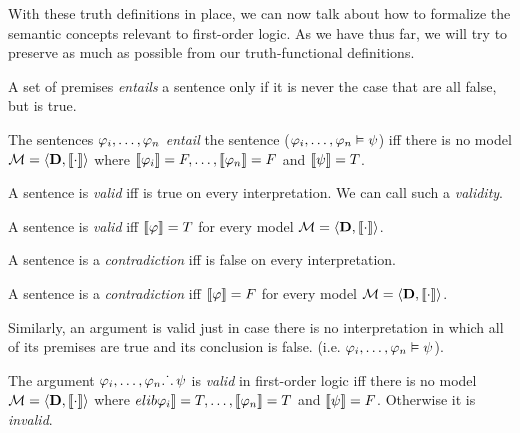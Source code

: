 With these truth definitions in place, we can now talk about how to formalize
the semantic concepts relevant to first-order logic. As we have thus far, we
will try to preserve as much as possible from our truth-functional definitions.

A set of premises \eGamma \emph{entails} a sentence \epsi only if it is never
the case that \eGamma are all false, but \epsi is true. 

\begin{definition}[Entailment]
  \label{def:fol-entailment}
  The sentences $\varphi_i,\dots,\varphi_n$ \emph{entail} the sentence \epsi
  ($\varphi_i,\dots,\varphi_n\vDash\psi$)
  iff there is no model $\mathcal{M}=\langle\mathbf{D},\llbracket\cdot\rrbracket\rangle$
  where $\llbracket\varphi_i\rrbracket=F,\dots,\llbracket\varphi_n\rrbracket=F$ and $\llbracket\psi\rrbracket=T$.
\end{definition}

A sentence \ephi is \emph{valid} iff \ephi is true on every interpretation. We
can call such \ephi a \emph{validity}.

\begin{definition}[Validity]
  \label{def:fol-validity}
  A sentence \ephi is \emph{valid} iff $\llbracket\varphi\rrbracket=T$ for every
  model $\mathcal{M}=\langle\mathbf{D},\llbracket\cdot\rrbracket\rangle$.
  \\
\end{definition}

A sentence \ephi is a \emph{contradiction} iff \ephi is false on every
interpretation.

\begin{definition}[Contradiction]
  \label{def:fol-contradiction}
  A sentence \ephi is a \emph{contradiction} iff $\llbracket\varphi\rrbracket=F$ for every
  model $\mathcal{M}=\langle\mathbf{D},\llbracket\cdot\rrbracket\rangle$.
\end{definition}

Similarly, an argument is valid just in case there is no interpretation
in which all of its premises are true and its conclusion is false. (i.e.
$\varphi_i,\dots,\varphi_n\vDash\psi$).

\begin{definition}
  \label{def:fol-valid}
  The argument $\varphi_i,\dots,\varphi_n\ldotp\dot{}\,\ldotp\psi$ is \emph{valid} in
  first-order logic iff there is no model
  $\mathcal{M}=\langle\mathbf{D},\llbracket\cdot\rrbracket\rangle$ where
  $elib\varphi_i\rrbracket=T,\dots,\llbracket\varphi_n\rrbracket=T$ and $\llbracket\psi\rrbracket=F$.
  Otherwise it is \emph{invalid}.
\end{definition}

